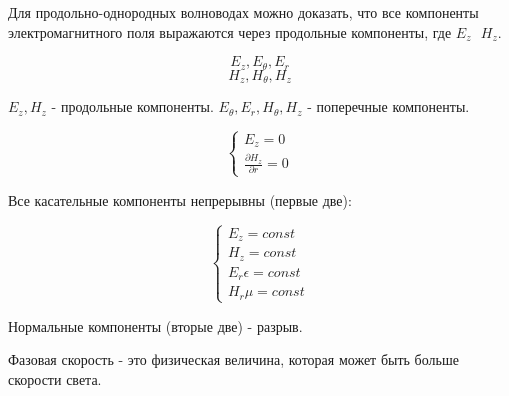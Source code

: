 Для продольно-однородных волноводах можно доказать, что все компоненты электромагнитного поля выражаются через продольные компоненты, где $E_z ~~~ H_z$.

\[
E_z, E_{\theta}, E_r
\]
\[
H_z, H_{\theta}, H_z
\]

$E_z, H_z$ - продольные компоненты. $E_{\theta}, E_r, H_{\theta}, H_z$ - поперечные компоненты.

\[
\begin{cases}
	E_z = 0 \\
	\frac{\partial H_z}{\partial r} = 0
\end{cases}
\]

Все касательные компоненты непрерывны (первые две):

\[
\begin{cases}
	E_z = const \\
	H_z = const \\
	E_r \epsilon = const \\
	H_r \mu = const
\end{cases}
\]

Нормальные компоненты (вторые две) - разрыв.

\begin{definition}
	Фазовая скорость - это физическая величина, которая может быть больше скорости света.
\end{definition}

\newpage

\tableofcontents

